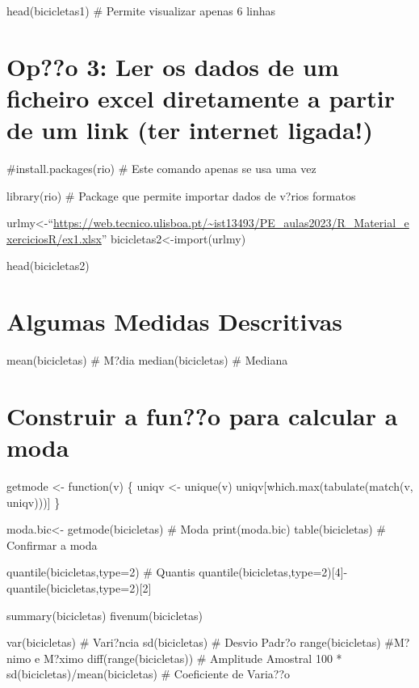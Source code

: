 \documentclass[
]{article}
\begin{document}
head(bicicletas1) \# Permite visualizar apenas 6 linhas

\hypertarget{opo-3-ler-os-dados-de-um-ficheiro-excel-diretamente-a-partir-de-um-link-ter-internet-ligada}{%
\section{Op??o 3: Ler os dados de um ficheiro excel diretamente a partir
de um link (ter internet
ligada!)}\label{opo-3-ler-os-dados-de-um-ficheiro-excel-diretamente-a-partir-de-um-link-ter-internet-ligada}}

\#install.packages(rio) \# Este comando apenas se usa uma vez

library(rio) \# Package que permite importar dados de v?rios formatos

urlmy\textless-``\url{https://web.tecnico.ulisboa.pt/~ist13493/PE_aulas2023/R_Material_exerciciosR/ex1.xlsx}''
bicicletas2\textless-import(urlmy)

head(bicicletas2)

\hypertarget{algumas-medidas-descritivas}{%
\section{Algumas Medidas
Descritivas}\label{algumas-medidas-descritivas}}

mean(bicicletas) \# M?dia median(bicicletas) \# Mediana

\hypertarget{construir-a-funo-para-calcular-a-moda}{%
\section{Construir a fun??o para calcular a
moda}\label{construir-a-funo-para-calcular-a-moda}}

getmode \textless- function(v) \{ uniqv \textless- unique(v)
uniqv{[}which.max(tabulate(match(v, uniqv))){]} \}

moda.bic\textless- getmode(bicicletas) \# Moda print(moda.bic)
table(bicicletas) \# Confirmar a moda

quantile(bicicletas,type=2) \# Quantis
quantile(bicicletas,type=2){[}4{]}-quantile(bicicletas,type=2){[}2{]}

summary(bicicletas) fivenum(bicicletas)

var(bicicletas) \# Vari?ncia sd(bicicletas) \# Desvio Padr?o
range(bicicletas) \#M?nimo e M?ximo diff(range(bicicletas)) \# Amplitude
Amostral 100 * sd(bicicletas)/mean(bicicletas) \# Coeficiente de
Varia??o
\end{document}
